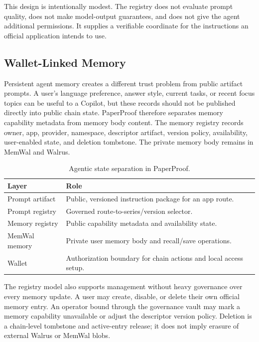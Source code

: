 \documentclass[journal]{IEEEtran}
\begin{document}
This design is intentionally modest. The registry does not evaluate prompt quality, does not make model-output guarantees, and does not give the agent additional permissions. It supplies a verifiable coordinate for the instructions an official application intends to use.

\subsection{Wallet-Linked Memory}

Persistent agent memory creates a different trust problem from public artifact prompts. A user's language preference, answer style, current tasks, or recent focus topics can be useful to a Copilot, but these records should not be published directly into public chain state. PaperProof therefore separates memory capability metadata from memory body content. The memory registry records owner, app, provider, namespace, descriptor artifact, version policy, availability, user-enabled state, and deletion tombstone. The private memory body remains in MemWal and Walrus.

\begin{table}[!t]
\caption{Agentic state separation in PaperProof.}
\label{tab:agentic_state}
\centering
\begin{tabularx}{\columnwidth}{p{}X}
\toprule
\textbf{Layer} & \textbf{Role} \\
\midrule
Prompt artifact & Public, versioned instruction package for an app route. \\
Prompt registry & Governed route-to-series/version selector. \\
Memory registry & Public capability metadata and availability state. \\
MemWal memory & Private user memory body and recall/save operations. \\
Wallet & Authorization boundary for chain actions and local access setup. \\
\bottomrule
\end{tabularx}
\end{table}

The registry model also supports management without heavy governance over every memory update. A user may create, disable, or delete their own official memory entry. An operator bound through the governance vault may mark a memory capability unavailable or adjust the descriptor version policy. Deletion is a chain-level tombstone and active-entry release; it does not imply erasure of external Walrus or MemWal blobs.
\end{document}

